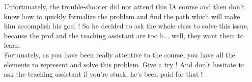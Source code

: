 \documentclass[11pt,a4paper,BCOR12mm, headexclude, footexclude, twoside, openright]{scrartcl}
\numberwithin{equation}{section} %
\numberwithin{figure}{section} %
\numberwithin{table}{section} %
\begin{document}
Unfortunately, the trouble-shooter did not attend this IA course and then don't know how to quickly formalize the problem and find the path which will make him accomplish his goal ! So he decided to ask the whole class to solve this issue, because the prof and the teaching assistant are too b... well, they want them to learn.\\

Fortunately, as you have been really attentive to the course, you have all the elements to represent and solve this problem. Give a try ! And don't hesitate to ask the teaching assistant if you're stuck, he's been paid for that !







\end{document}
